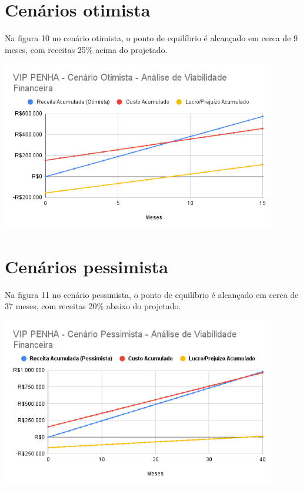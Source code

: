 \documentclass[
	12pt,				%
	openany,			%
	twoside,			%
	a4paper,			%
	english,			%
	brazil				%
	]{abntex2}
\begin{document}
\section{Cenários otimista}
Na figura 10 no cenário otimista, o ponto de equilíbrio é alcançado em cerca de 9 meses, com receitas 25\% acima do projetado.
\begin{center}
  \includegraphics[width=0.9\textwidth]{Figuras/CenarioOtimista.png}
\end{center}

\section{Cenários pessimista}
Na figura 11 no cenário pessimista, o ponto de equilíbrio é alcançado em cerca de 37 meses, com receitas 20\% abaixo do projetado.
\begin{center}
  \includegraphics[width=0.9\textwidth]{Figuras/CenarioPessimista.png}
\end{center}
\end{document}
